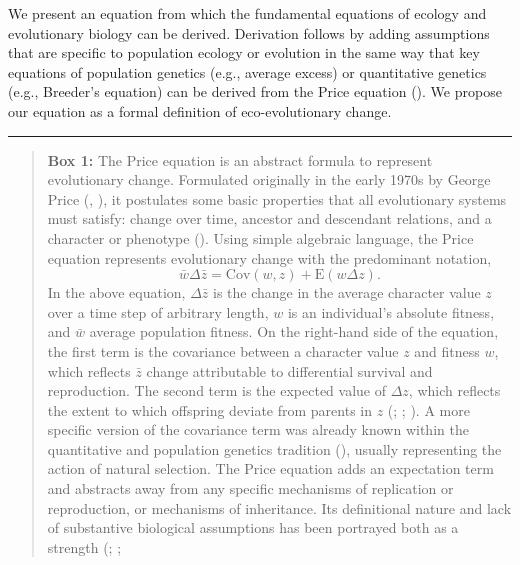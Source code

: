 \documentclass[
]{article}
\begin{document}
We present an equation from which the fundamental equations of ecology
and evolutionary biology can be derived. Derivation follows by adding
assumptions that are specific to population ecology or evolution in the
same way that key equations of population genetics (e.g., average
excess) or quantitative genetics (e.g., Breeder's equation) can be
derived from the Price equation (). We propose our equation as a formal definition of
eco-evolutionary change.

\begin{center}\rule{0.5\linewidth}{0.5pt}\end{center}

\begin{quote}
\textbf{Box 1:} The Price equation is an abstract formula to represent
evolutionary change. Formulated originally in the early 1970s by George
Price (,
), it postulates some basic properties
that all evolutionary systems must satisfy: change over time, ancestor
and descendant relations, and a character or phenotype
(). Using simple algebraic language,
the Price equation represents evolutionary change with the predominant
notation,
\[\bar{w}\Delta\bar{z} = \mathrm{Cov}\left(w, z\right) + \mathrm{E}\left(w\Delta z\right).\]
In the above equation, \(\Delta\bar{z}\) is the change in the average
character value \(z\) over a time step of arbitrary length, \(w\) is an
individual's absolute fitness, and \(\bar{w}\) average population
fitness. On the right-hand side of the equation, the first term is the
covariance between a character value \(z\) and fitness \(w\), which
reflects \(\bar{z}\) change attributable to differential survival and
reproduction. The second term is the expected value of \(\Delta z\),
which reflects the extent to which offspring deviate from parents in
\(z\) (;
; ). A more specific version of the covariance term was already known
within the quantitative and population genetics tradition
(), usually representing the
action of natural selection. The Price equation adds an expectation term
and abstracts away from any specific mechanisms of replication or
reproduction, or mechanisms of inheritance. Its definitional nature and
lack of substantive biological assumptions has been portrayed both as a
strength (;
; 
\end{quote}
\end{document}

